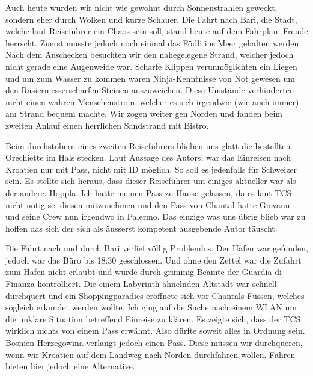 Auch heute wurden wir nicht wie gewohnt durch Sonnenstrahlen geweckt, sondern eher durch Wolken und kurze Schauer.
Die Fahrt nach Bari, die Stadt, welche laut Reiseführer ein Chaos sein soll, stand heute auf dem Fahrplan.
Freude herrscht.
Zuerst musste jedoch noch einmal das Födli ins Meer gehalten werden.
Nach dem Auschecken besuchten wir den nahegelegene Strand, welcher jedoch nicht gerade eine Augenweide war.
Scharfe Klippen verunmöglichten ein Liegen und um zum Wasser zu kommen waren Ninja-Kenntnisse von Not gewesen um den Rasiermesserscharfen Steinen auszuweichen.
Diese Umstände verhinderten nicht einen wahren Menschenstrom, welcher es sich irgendwie (wie auch immer) am Strand bequem machte.
Wir zogen weiter gen Norden und fanden beim zweiten Anlauf einen herrlichen Sandstrand mit Bistro.

Beim durchstöbern eines zweiten Reiseführers blieben uns glatt die bestellten Orechiette im Hals stecken.
Laut Aussage des Autors, war das Einreisen nach Kroatien nur mit Pass, nicht mit ID möglich.
So soll es jedenfalls für Schweizer sein.
Es stellte sich heraus, dass dieser Reiseführer um einiges aktueller war als der andere.
Hoppla.
Ich hatte meinen Pass zu Hause gelassen, da es laut TCS nicht nötig sei diesen mitzunehmen und den Pass von Chantal hatte Giovanni und seine Crew nun irgendwo in Palermo.
Das einzige was uns übrig blieb war zu hoffen das sich der sich als äusserst kompetent ausgebende Autor täuscht.

Die Fahrt nach und durch Bari verlief völlig Problemlos.
Der Hafen war gefunden, jedoch war das Büro bis 18:30 geschlossen.
Und ohne den Zettel war die Zufahrt zum Hafen nicht erlaubt und wurde durch grimmig Beamte der Guardia di Finanza kontrolliert.
Die einem Labyrinth ähnelnden Altstadt war schnell durchquert und ein Shoppingparadies eröffnete sich vor Chantals Füssen, welches sogleich erkundet werden wollte.
Ich ging auf die Suche nach einem WLAN um die unklare Situation betreffend Einreise zu klären.
Es zeigte sich, dass der TCS wirklich nichts von einem Pass erwähnt.
Also dürfte soweit alles in Ordnung sein.
Bosnien-Herzegowina verlangt jedoch einen Pass.
Diese müssen wir durchqueren, wenn wir Kroatien auf dem Landweg nach Norden durchfahren wollen.
Fähren bieten hier jedoch eine Alternative.

